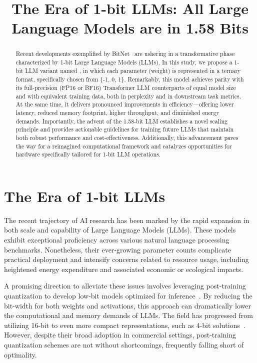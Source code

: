 \title{The Era of 1-bit LLMs: All Large Language Models are in 1.58 Bits}

\begin{abstract}
Recent developments exemplified by BitNet~\cite{bitnet} are ushering in a transformative phase characterized by 1-bit Large Language Models (LLMs). In this study, we propose a 1-bit LLM variant named \textbf{}, in which each parameter (weight) is represented in a ternary format, specifically chosen from \{-1, 0, 1\}. Remarkably, this model achieves parity with its full-precision (FP16 or BF16) Transformer LLM counterparts of equal model size and with equivalent training data, both in perplexity and in downstream task metrics. At the same time, it delivers pronounced improvements in efficiency—offering lower latency, reduced memory footprint, higher throughput, and diminished energy demands. Importantly, the advent of the 1.58-bit LLM establishes a novel scaling principle and provides actionable guidelines for training future LLMs that maintain both robust performance and cost-effectiveness. Additionally, this advancement paves the way for a reimagined computational framework and catalyzes opportunities for hardware specifically tailored for 1-bit LLM operations.
\end{abstract}

\section{The Era of 1-bit LLMs}

The recent trajectory of AI research has been marked by the rapid expansion in both scale and capability of Large Language Models (LLMs). These models exhibit exceptional proficiency across various natural language processing benchmarks. Nonetheless, their ever-growing parameter counts complicate practical deployment and intensify concerns related to resource usage, including heightened energy expenditure and associated economic or ecological impacts.

A promising direction to alleviate these issues involves leveraging post-training quantization to develop low-bit models optimized for inference~\cite{smoothquant, gptq, quip, quip_sharp}. By reducing the bit-width for both weights and activations, this approach can dramatically lower the computational and memory demands of LLMs. The field has progressed from utilizing 16-bit to even more compact representations, such as 4-bit solutions~\cite{gptq, awq}. However, despite their broad adoption in commercial settings, post-training quantization schemes are not without shortcomings, frequently falling short of optimality.

